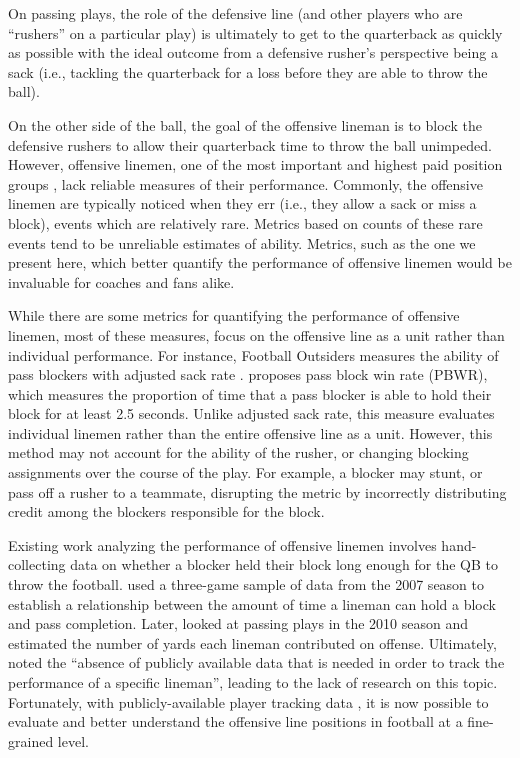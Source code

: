 \documentclass[USenglish]{article}
\let\OldSubsection\subsection
\renewcommand{\subsection}{\FloatBarrier\OldSubsection}
\theoremstyle{dgthm}
\theoremstyle{dgdef}
\begin{document}
On passing plays, the role of the defensive line (and other players who are ``rushers'' on a particular play) is ultimately to get to the quarterback as quickly as possible with the ideal outcome from a defensive rusher's perspective being a sack (i.e., tackling the quarterback for a loss before they are able to throw the ball). 

On the other side of the ball, the goal of the offensive lineman is to block the defensive rushers to allow their quarterback time to throw the ball unimpeded. However, offensive linemen, one of the most important and highest paid position groups \citep{atienza2026paid}, lack reliable measures of their performance. Commonly, the offensive linemen are typically noticed when they err (i.e., they allow a sack or miss a block), events which are relatively rare. Metrics based on counts of these rare events tend to be unreliable estimates of ability. Metrics, such as the one we present here, which better quantify the performance of offensive linemen would be invaluable for coaches and fans alike.

While there are some metrics for quantifying the performance of offensive linemen, most of these measures, focus on the offensive line as a unit rather than individual performance.  For instance, Football Outsiders measures the ability of pass blockers with adjusted sack rate \citep{fo2023glossary}. 
\cite{Burke2018Created} proposes pass block win rate (PBWR), which measures the proportion of time that a pass blocker is able to hold their block for at least 2.5 seconds.  Unlike adjusted sack rate, this measure evaluates individual linemen rather than the entire offensive line as a unit. However, this method may not account for the ability of the rusher, or changing blocking assignments over the course of the play. For example, a blocker may stunt, or pass off a rusher to a teammate, disrupting the metric by incorrectly distributing credit among the blockers responsible for the block.  

Existing work analyzing the performance of offensive linemen involves hand-collecting data on whether a blocker held their block long enough for the QB to throw the football. \citet{AlamarGould2008} used a three-game sample of data from the 2007 season to establish a relationship between the amount of time a lineman can hold a block and pass completion. Later, \cite{AlamarGoldner2011} looked at passing plays in the 2010 season and estimated the number of yards each lineman contributed on offense. Ultimately, \cite{AlamarGould2008} noted the ``absence of publicly available data that is needed in order to track the performance of a specific lineman'', leading to the lack of research on this topic.  Fortunately, with publicly-available player tracking data \cite{nfl2023big}, it is now possible to evaluate and better understand the offensive line positions in football at a fine-grained level.
\end{document}
